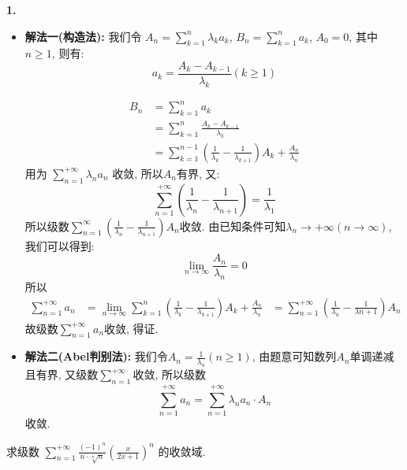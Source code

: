 \documentclass[12pt]{article}
\newenvironment{solution}[2][Solution]{\begin{trivlist}
\item[\hskip \labelsep {\bfseries #1}]}{\end{trivlist}}
\newenvironment{problem}[2][Problem]{\begin{trivlist}
\item[\hskip \labelsep {\bfseries #1}\hskip \labelsep {\bfseries #2.}]}{\end{trivlist}}
\begin{document}
\begin{solution}{1} \textbf{1.}

\begin{itemize}  

	\item \textbf{解法一(构造法):} 我们令 $\displaystyle{A_n=\sum_{k=1}^{n}\lambda_k a_k}$, $\displaystyle{B_n = \sum_{k=1}^{n}a_k}$, $A_0=0$, 其中$n\geq1$, 则有:
\[
a_k = \frac{A_k - A_{k-1}}{\lambda_k} (k\geq1)
\]

\[
\begin{aligned}
B_n &= \sum_{k=1}^{n}a_k \\
&= \sum_{k=1}^{n} \frac{A_k - A_{k-1}}{\lambda_k}\\
&= \sum_{k=1}^{n-1} (\frac{1}{\lambda_k}-\frac{1}{\lambda_{k+1}}) A_k + \frac{A_n}{\lambda_n}
\end{aligned}
\]
用为 $\displaystyle{\sum_{n=1}^{+\infty}} \lambda_n a_n$ 收敛, 所以$A_n$有界, 又:
\[
\sum_{n=1}^{+\infty}(\frac{1}{\lambda_n} - \frac{1}{\lambda_{n+1}}) = \frac{1}{\lambda_1}
\]
所以级数$\displaystyle{\sum_{n=1}^{\infty}}(\frac{1}{\lambda_n} - \frac{1}{\lambda_{n+1}})A_n$收敛. 由已知条件可知$\lambda_n \to +\infty(n\to\infty)$, 我们可以得到:
\[
\lim_{n\to\infty} \frac{A_n}{\lambda_n} = 0
\]
所以
\[
\begin{aligned}
\sum_{n=1}^{+\infty} a_n 
&= \lim_{n\to\infty} \sum_{k=1}^{n} (\frac{1}{\lambda_k}-\frac{1}{\lambda_{k+1}})A_k+\frac{A_n}{\lambda_n}
&= \sum_{n=1}^{+\infty} (\frac{1}{\lambda_n} - \frac{1}{\lambda{n+1}})A_n
\end{aligned}
\]
故级数$\displaystyle{\sum_{n=1}^{+\infty}}a_n$收敛, 得证.



	\item \textbf{解法二(Abel判别法):} 我们令$A_n = \frac{1}{\lambda_n}(n\geq1)$, 由题意可知数列$A_n$单调递减且有界, 又级数$\displaystyle{\sum_{n=1}^{+\infty}}$收敛, 所以级数
\[
\sum_{n=1}^{+\infty}a_n = \sum_{n=1}^{+\infty}\lambda_n a_n \cdot{} A_n
\]
收敛.

\end{itemize}
\end{solution}

\vspace{3cm}

\begin{problem}{2}
    求级数 $\displaystyle \sum_{n=1}^{+\infty} \frac{(-1)^n}{n \cdot \sqrt[n]{n}} (\frac{x}{2x+1})^n$ 的收敛域.
\end{problem}
\end{document}
